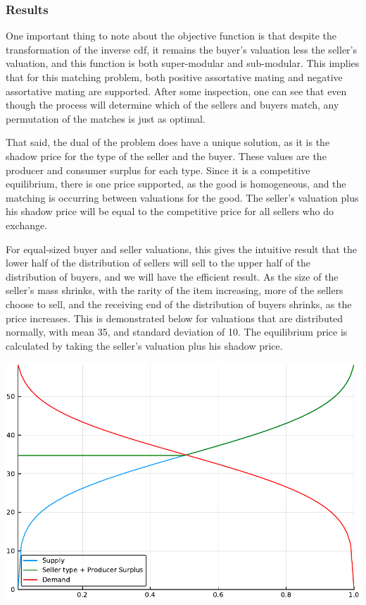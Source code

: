 \documentclass[12pt, letterpaper]{paper}
\begin{document}
\subsubsection{Results}
\label{sec-2-1-1}
One important thing to note about the objective function is that
despite the transformation of the inverse cdf, it remains the buyer's
valuation less the seller's valuation, and this function is both
super-modular and sub-modular. This implies that for this matching
problem, both positive assortative mating and negative assortative
mating are supported. After some inspection, one can see that even though
the process will determine which of the sellers and buyers
match, any permutation of the matches is just as optimal.

That said, the dual of the problem does have a unique solution, as it is
the shadow price for the type of the seller and the buyer. These
values are the producer and consumer surplus for each type. Since it is
a competitive equilibrium, there is one price supported, as the good
is homogeneous, and the matching is occurring between valuations for the
good. The seller's valuation plus his shadow price will be equal to
the competitive price for all sellers who do exchange. 

For equal-sized buyer and seller valuations, this gives the intuitive
result that the lower half of the distribution of sellers will sell to
the upper half of the distribution of buyers, and we will have the
efficient result. As the size of the seller's mass shrinks, with the
rarity of the item increasing, more of the sellers choose to sell, and
the receiving end of the distribution of buyers shrinks, as the price
increases. This is demonstrated below for valuations that are
distributed normally, with mean 35, and standard deviation of 10. The
equilibrium price is calculated by taking the seller's valuation plus
his shadow price. 

\includegraphics[width=.9\linewidth]{../Scripts/evenStevens.pdf}
\end{document}

